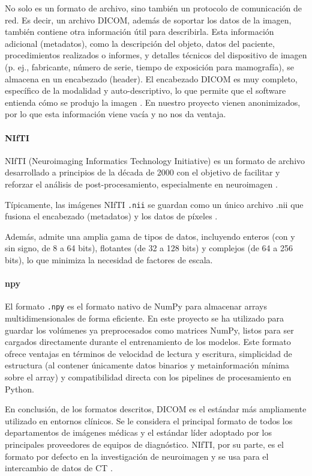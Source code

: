 No solo es un formato de archivo, sino también un protocolo de comunicación de red. Es decir, un archivo DICOM, además de soportar los datos de la imagen, también contiene otra información útil para describirla. Esta información adicional (metadatos), como la descripción del objeto, datos del paciente, procedimientos realizados o informes, y detalles técnicos del dispositivo de imagen (p. ej., fabricante, número de serie, tiempo de exposición para mamografía), se almacena en un encabezado (header). El encabezado DICOM es muy completo, específico de la modalidad y auto-descriptivo, lo que permite que el software entienda cómo se produjo la imagen  \parencite{larobina2014medical}. En nuestro proyecto vienen anonimizados, por lo que esta información viene vacía y no nos da ventaja. 


\paragraph{NIfTI}
NIfTI (Neuroimaging Informatics Technology Initiative) es un formato de archivo desarrollado a principios de la década de 2000 con el objetivo de facilitar y reforzar el análisis de post-procesamiento, especialmente en neuroimagen \parencite{larobina2014medical}.

Típicamente, las imágenes NIfTI  \texttt{.nii} se guardan como un único archivo .nii que fusiona el encabezado (metadatos) y los datos de píxeles \parencite{singh2023secure}.

Además, admite una amplia gama de tipos de datos, incluyendo enteros (con y sin signo, de 8 a 64 bits), flotantes (de 32 a 128 bits) y complejos (de 64 a 256 bits), lo que minimiza la necesidad de factores de escala.

\paragraph{npy}
El formato \texttt{.npy} es el formato nativo de NumPy para almacenar arrays multidimensionales de forma eficiente. En este proyecto se ha utilizado para guardar los volúmenes ya preprocesados como matrices NumPy, listos para ser cargados directamente durante el entrenamiento de los modelos. Este formato ofrece ventajas en términos de velocidad de lectura y escritura, simplicidad de estructura (al contener únicamente datos binarios y metainformación mínima sobre el array) y compatibilidad directa con los pipelines de procesamiento en Python. 

En conclusión, de los formatos descritos, DICOM es el estándar más ampliamente utilizado en entornos clínicos. Se le considera el principal formato de todos los departamentos de imágenes médicas y el estándar líder adoptado por los principales proveedores de equipos de diagnóstico. NIfTI, por su parte, es el formato por defecto en la investigación de neuroimagen y se usa para el intercambio de datos de CT \parencite{larobina2014medical}.


